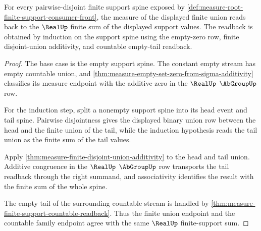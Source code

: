 \begin{theorem}
\label{thm:measure-root-finite-support-additivity-readback}
For every pairwise-disjoint finite support spine exposed by
\autoref{def:measure-root-finite-support-consumer-front}, the measure of the
displayed finite union reads back to the $\RealUp$ finite sum of the displayed
support values. The readback is obtained by induction on the support spine
using the empty-zero row, finite disjoint-union additivity, and countable
empty-tail readback.
\end{theorem}
\begin{proof}
The base case is the empty support spine. The constant empty stream has empty
countable union, and
\autoref{thm:measure-empty-set-zero-from-sigma-additivity} classifies its
measure endpoint with the additive zero in the $\RealUp$ $\AbGroupUp$ row.

For the induction step, split a nonempty support spine into its head event and
tail spine. Pairwise disjointness gives the displayed binary union row between
the head and the finite union of the tail, while the induction hypothesis
reads the tail union as the finite sum of the tail values.

Apply \autoref{thm:measure-finite-disjoint-union-additivity} to the head and
tail union. Additive congruence in the $\RealUp$ $\AbGroupUp$ row transports
the tail readback through the right summand, and associativity identifies the
result with the finite sum of the whole spine.

The empty tail of the surrounding countable stream is handled by
\autoref{thm:measure-finite-support-countable-readback}. Thus the finite
union endpoint and the countable family endpoint agree with the same
$\RealUp$ finite-support sum.
\end{proof}

